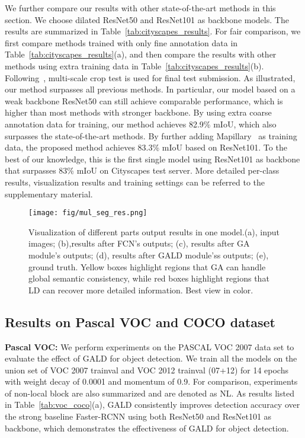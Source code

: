 \documentclass{bmvc2k}
\begin{document}
We further compare our results with other state-of-the-art methods in this section. We choose dilated ResNet50 and ResNet101 as backbone models. The results are summarized in Table~\ref{tab:cityscapes_results}. For fair comparison, we first compare methods trained with only fine annotation data in Table~\ref{tab:cityscapes_results}(a), and then compare the results with other methods using extra training data in Table~\ref{tab:cityscapes_results}(b). Following~\cite{pspnet}, multi-scale crop test is used for final test submission.
As illustrated, our method surpasses all previous methods. In particular, our model based on a weak backbone ResNet50 can still achieve comparable performance, which is higher than most methods with stronger backbone. By using extra coarse annotation data for training, our method achieves 82.9\% mIoU, which also surpasses the state-of-the-art methods. By further adding Mapillary~\cite{mapillary} as training data, the proposed method achieves 83.3\% mIoU based on ResNet101. To the best of our knowledge, this is the first single model using ResNet101 as backbone that surpasses 83\% mIoU on Cityscapes test server. More detailed per-class results, visualization results and training settings can be referred to the supplementary material. 


\begin{figure*}
	\centering
	\texttt{[image: fig/mul\_seg\_res.png]}
	\caption{
		Visualization of different parts output results in one model.(a), input images; (b),results after FCN's outputs; (c), results after GA module's outputs; (d), results after GALD module'ss outputs;
		(e), ground truth. Yellow boxes highlight regions that GA can handle global semantic consistency, while red boxes highlight regions that LD can recover more detailed information.
		Best view in color.}
	\label{fig:attenion_mask}
\end{figure*}


\subsection{Results on Pascal VOC and COCO dataset}
 { \bfseries Pascal VOC:} 
 We perform experiments on the PASCAL VOC 2007 data set to evaluate the effect of GALD for object detection. We train all the models on the union set of VOC 2007 trainval and VOC 2012 trainval (07+12) for 14 epochs with weight decay of 0.0001 and momentum of 0.9. 
 For comparison, experiments of non-local block \cite{Nonlocal} are also summarized and are denoted as NL. 
 As results listed in Table~\ref{tab:voc_coco}(a), GALD consistently improves detection accuracy over the strong baseline Faster-RCNN using both ResNet50 and ResNet101 as backbone, which demonstrates the effectiveness of GALD for object detection. 
\end{document}
